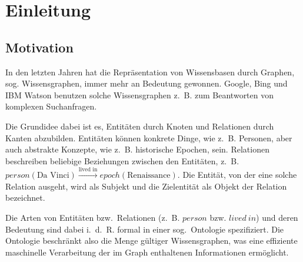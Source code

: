 \chapter{Einleitung}%
\label{sec:intro}


\section{Motivation}%
\label{sec:intro:motivation}

In den letzten Jahren hat die Repräsentation von Wissensbasen durch Graphen, sog. Wissensgraphen, immer mehr an Bedeutung gewonnen.
Google, Bing und IBM Watson benutzen solche Wissensgraphen z.~B. zum Beantworten von komplexen Suchanfragen.

Die Grundidee dabei ist es, Entitäten durch Knoten und Relationen durch Kanten abzubilden.
Entitäten können konkrete Dinge, wie z.~B. Personen, aber auch abstrakte Konzepte, wie z.~B. historische Epochen, sein.
Relationen beschreiben beliebige Beziehungen zwischen den Entitäten, z.~B. $person(\text{Da~Vinci}) \xrightarrow{\text{lived~in}} epoch(\text{Renaissance})$.
Die Entität, von der eine solche Relation ausgeht, wird als Subjekt und die Zielentität als Objekt der Relation bezeichnet.

Die Arten von Entitäten bzw.\ Relationen (z.~B. $person$ bzw. $lived~in$) und deren Bedeutung sind dabei i.~d.~R. formal in einer sog.\ Ontologie spezifiziert.
Die Ontologie beschränkt also die Menge gültiger Wissensgraphen, was eine effiziente maschinelle Verarbeitung der im Graph enthaltenen Informationen ermöglicht.

